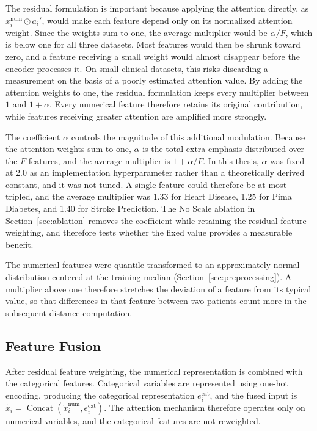 \documentclass[11pt,a4paper,oneside, openany, reqno, chapter, nokorean]{oblivoir}
\theoremstyle{definition}
\theoremstyle{remark}
\numberwithin{equation}{chapter}
\theoremstyle{definition}
\theoremstyle{remark}
\theoremstyle{definition}
\begin{document}
The residual formulation is important because applying the attention directly,
as $x_i^{\mathrm{num}}\odot a_i'$, would make each feature depend only on its
normalized attention weight. Since the weights sum to one, the average
multiplier would be $\alpha/F$, which is below one for all three datasets.
Most features would then be shrunk toward zero, and a feature receiving a
small weight would almost disappear before the encoder processes it. On small
clinical datasets, this risks discarding a measurement on the basis of a
poorly estimated attention value. By adding the attention weights to one, the
residual formulation keeps every multiplier between $1$ and $1+\alpha$. Every
numerical feature therefore retains its original contribution, while features
receiving greater attention are amplified more strongly.

The coefficient $\alpha$ controls the magnitude of this additional modulation.
Because the attention weights sum to one, $\alpha$ is the total extra emphasis
distributed over the $F$ features, and the average multiplier is $1+\alpha/F$.
In this thesis, $\alpha$ was fixed at 2.0 as an implementation hyperparameter
rather than a theoretically derived constant, and it was not tuned. A single
feature could therefore be at most tripled, and the average multiplier was
1.33 for Heart Disease, 1.25 for Pima Diabetes, and 1.40 for Stroke
Prediction. The No Scale ablation in Section~\ref{sec:ablation} removes the
coefficient while retaining the residual feature weighting, and therefore tests whether the
fixed value provides a measurable benefit.

The numerical features were quantile-transformed to an approximately normal
distribution centered at the training median
(Section~\ref{sec:preprocessing}). A multiplier above one therefore stretches
the deviation of a feature from its typical value, so that differences in that
feature between two patients count more in the subsequent distance
computation.

\subsection{Feature Fusion}
\label{sec:fusion}

After residual feature weighting, the numerical representation is combined
with the categorical features. Categorical variables are represented using
one-hot encoding, producing the categorical representation
$e_i^{\mathrm{cat}}$, and the fused input is
$\tilde{x}_i=\operatorname{Concat}(\tilde{x}_i^{\mathrm{num}},
e_i^{\mathrm{cat}})$. The attention mechanism therefore operates only on
numerical variables, and the categorical features are not reweighted.
\end{document}
